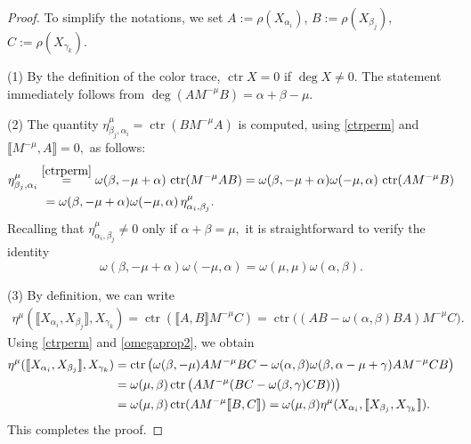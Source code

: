 \documentclass[pdftex]{sigma}
\numberwithin{equation}{section}
\theoremstyle{definition}
\def\nn{\notag}
\begin{document}
\begin{proof}
	To simplify the notations, we set $ A := \rho(X_{\alpha_i})$, $B := \rho(X_{\beta_j})$, $C := \rho(X_{\gamma_k})$.

(1) By the definition of the color trace, $\operatorname{ctr} X = 0 $ if $\deg X \neq 0.$
		The statement immediately follows from $ \deg (AM^{-\mu}B) = \alpha + \beta - \mu$.

(2) The quantity $\eta^{\mu}_{\beta_j,\alpha_i} = \operatorname{ctr}(B M^{-\mu} A) $ is computed, using \eqref{ctrperm} and $ \llbracket M^{-\mu}, A \rrbracket = 0, $ as follows:
		\begin{align*}
			\eta^{\mu}_{\beta_j,\alpha_i} &
			\stackrel{\eqref{ctrperm}}{=} \omega(\beta,-\mu+\alpha)\, \operatorname{ctr}(M^{-\mu} A B)
			= \omega(\beta,-\mu+\alpha) \omega(-\mu,\alpha)\, \operatorname{ctr}(A M^{-\mu} B)
			\nn \\
			&\, \, = \omega(\beta,-\mu+\alpha) \omega(-\mu,\alpha)\, \eta^{\mu}_{\alpha_i, \beta_j}.
		\end{align*}
		Recalling that $ \eta^{\mu}_{\alpha_i, \beta_j} \neq 0 $ only if $ \alpha+\beta = \mu,$
		it is straightforward to verify the identity
\[
\omega(\beta,-\mu+\alpha) \omega(-\mu,\alpha) = \omega(\mu,\mu) \omega(\alpha,\beta).
\]

(3) By definition, we can write
		\begin{align*}
			\eta^{\mu}(\llbracket X_{\alpha_i}, X_{\beta_j} \rrbracket, X_{\gamma_k} ) =
			\operatorname{ctr}(\llbracket A, B \rrbracket M^{-\mu}C)
			=\operatorname{ctr}\big( (AB - \omega(\alpha,\beta) BA) M^{-\mu}C \big).
		\end{align*}
		Using \eqref{ctrperm} and \eqref{omegaprop2}, we obtain
		\begin{align*}
			\eta^{\mu}(\llbracket X_{\alpha_i}, X_{\beta_j} \rrbracket, X_{\gamma_k} )
			&= \operatorname{ctr}\big( \omega(\beta,-\mu) A M^{-\mu} BC - \omega(\alpha,\beta) \omega(\beta,\alpha-\mu+\gamma) A M^{-\mu}CB \big)
			\nn \\
			&= \omega(\mu,\beta) \operatorname{ctr}\big( A M^{-\mu} (BC - \omega(\beta,\gamma) CB)) \big)
			\nn \\
			&= \omega(\mu,\beta) \operatorname{ctr} (A M^{-\mu} \llbracket B, C \rrbracket) = \omega(\mu,\beta) \eta^{\mu}(X_{\alpha_i}, \llbracket X_{\beta_j}, X_{\gamma_k} \rrbracket).
		\end{align*}
This completes the proof.
\end{proof}
\end{document}
